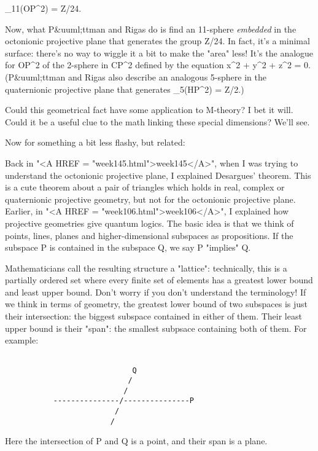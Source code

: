 \pi _{11}(OP^{2}) = Z/24.

Now, what P&uuml;ttman and Rigas do is find an 11-sphere \emph{embedded}
in the octonionic projective plane that generates the group Z/24.
In fact, it's a minimal surface: there's no way to wiggle it a
bit to make the "area" less!  It's the analogue
for OP^{2} of the 2-sphere in CP^{2} defined by
the equation x^{2} + y^{2} + z^{2} = 0.
(P&uuml;ttman and Rigas also describe an analogous 5-sphere in the
quaternionic projective plane that generates \pi _{5}(HP^{2}) 
= Z/2.)

Could this geometrical fact have some application to M-theory?  I bet 
it will.  Could it be a useful clue to the math linking these special 
dimensions?  We'll see.

Now for something a bit less flashy, but related:

Back in "<A HREF = "week145.html">week145</A>", when I was
trying to understand the octonionic projective plane, I explained
Desargues' theorem.  This is a cute theorem about a pair of triangles
which holds in real, complex or quaternionic projective geometry, but
not for the octonionic projective plane.  Earlier, in "<A HREF =
"week106.html">week106</A>", I explained how projective geometries
give quantum logics.  The basic idea is that we think of points, lines,
planes and higher-dimensional subspaces as propositions.  If the
subspace P is contained in the subspace Q, we say P "implies" Q.


Mathematicians call the resulting structure a "lattice":
technically, this is a partially ordered set where every finite set of
elements has a greatest lower bound and least upper bound.  Don't worry
if you don't understand the terminology!  If we think in terms of
geometry, the greatest lower bound of two subspaces is just their
intersection: the biggest subspace contained in either of them.  Their
least upper bound is their "span": the smallest subpsace
containing both of them.  For example:


\begin{verbatim}

                             Q
                            /
                           /
           ---------------/---------------P
                         /
                        /

\end{verbatim}
    
Here the intersection of P and Q is a point, and their span is a
plane.  

